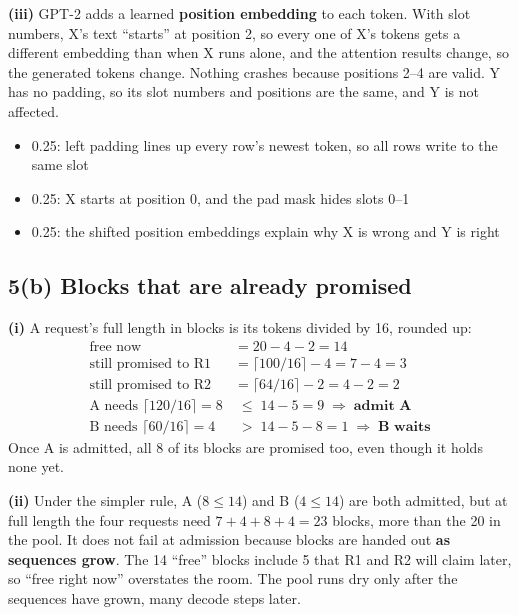 \documentclass[10pt]{article}
\newenvironment{rubric}{%
  \begin{tcolorbox}[colback=black!4, colframe=black!40, boxrule=0.4pt,
                    arc=0pt, title={Rubric}, fonttitle=\bfseries\small,
                    coltitle=black, colbacktitle=black!12]
  \small\begin{itemize}[leftmargin=*, nosep]}{%
  \end{itemize}\end{tcolorbox}}
\begin{document}
\textbf{(iii)} GPT-2 adds a learned \textbf{position embedding} to each
token. With slot numbers, X's text ``starts'' at position 2, so every one
of X's tokens gets a different embedding than when X runs alone, and the
attention results change, so the generated tokens change. Nothing crashes
because positions 2--4 are valid. Y has no padding, so its slot numbers
and positions are the same, and Y is not affected.

\begin{rubric}
\item 0.25: left padding lines up every row's newest token, so all rows
  write to the same slot
\item 0.25: X starts at position 0, and the pad mask hides slots 0--1
\item 0.25: the shifted position embeddings explain why X is wrong and Y
  is right
\end{rubric}

\subsection*{5(b) Blocks that are already promised}

\textbf{(i)} A request's full length in blocks is its tokens divided by
16, rounded up:
\begin{align*}
\text{free now} &= 20 - 4 - 2 = 14 \\
\text{still promised to R1} &= \lceil 100/16 \rceil - 4 = 7 - 4 = 3 \\
\text{still promised to R2} &= \lceil 64/16 \rceil - 2 = 4 - 2 = 2 \\
\text{A needs } \lceil 120/16 \rceil = 8 &\;\le\; 14 - 5 = 9
  \;\Rightarrow\; \textbf{admit A} \\
\text{B needs } \lceil 60/16 \rceil = 4 &\;>\; 14 - 5 - 8 = 1
  \;\Rightarrow\; \textbf{B waits}
\end{align*}
Once A is admitted, all 8 of its blocks are promised too, even though it
holds none yet.

\textbf{(ii)} Under the simpler rule, A ($8 \le 14$) and B ($4 \le 14$)
are both admitted, but at full length the four requests need $7 + 4 + 8
+ 4 = 23$ blocks, more than the 20 in the pool. It does not fail at
admission because blocks are handed out \textbf{as sequences grow}. The 14
``free'' blocks include 5 that R1 and R2 will claim later, so ``free right
now'' overstates the room. The pool runs dry only after the sequences
have grown, many decode steps later.
\end{document}
